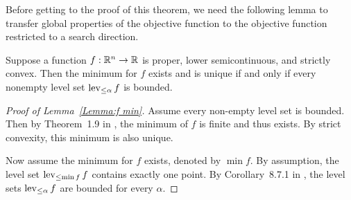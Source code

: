 Before getting to the proof of this theorem, we need the 
following lemma to transfer global properties of the objective function to the 
objective function restricted to a 
search direction.

\begin{lemma} \label{Lemma:f min} 
Suppose a function $f:{\mathbb R}^n \to {\mathbb R}$ is proper, lower semicontinuous, and strictly 
convex.  Then the minimum for $f$ 
exists and is unique if and only if every nonempty level set $\operatorname{lev}_{\leq \alpha} f$ is 
bounded.
\end{lemma}


\begin{proof}[Proof of Lemma~\ref{Lemma:f min}]
Assume every non-empty level set is bounded.  Then by Theorem~1.9 in \citet
{Rockafellar}, the minimum of $f$ is finite 
and thus exists.  By strict convexity, this minimum is also unique.

Now assume the minimum for $f$ exists, denoted by $\min f$.  By assumption, the level 
set $\operatorname{lev}_{\leq \min f} f$ 
contains exactly one point.  By Corollary~8.7.1 in \citet{Rockafellar:1970}, the level 
sets $\operatorname{lev}_{\leq \alpha} f$ are 
bounded for every $\alpha$.  
\end{proof}







